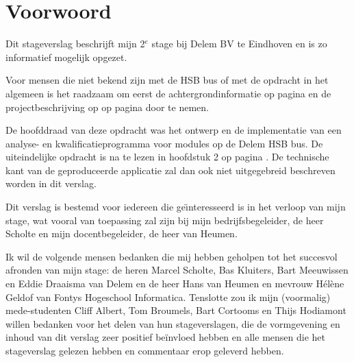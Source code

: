 \chapter{Voorwoord}

Dit stageverslag beschrijft mijn 2$^e$ stage bij Delem BV te Eindhoven en is zo informatief mogelijk opgezet.

Voor mensen die niet bekend zijn met de HSB bus of met de opdracht in het algemeen is het raadzaam om eerst de achtergrondinformatie op pagina \pageref{achtergrondinfo} en de projectbeschrijving op op pagina \pageref{project} door te nemen.

De hoofddraad van deze opdracht was het ontwerp en de implementatie van een analyse- en kwalificatieprogramma voor modules op de Delem HSB bus. De uiteindelijke opdracht is na te lezen in hoofdstuk 2 op pagina \pageref{opdracht}. De technische kant van de geproduceerde applicatie zal dan ook niet uitgegebreid beschreven worden in dit verslag.

Dit verslag is bestemd voor iedereen die ge\"\i nteresseerd is in het verloop van mijn stage, wat vooral van toepassing zal zijn bij mijn bedrijfsbegeleider, de heer Scholte en mijn docentbegeleider, de heer van Heumen.

Ik wil de volgende mensen bedanken die mij hebben geholpen tot het succesvol afronden van mijn stage: de heren Marcel Scholte, Bas Kluiters, Bart Meeuwissen en Eddie Draaisma van Delem en de heer Hans van Heumen en mevrouw H\'el\`ene Geldof van Fontys Hogeschool Informatica. Tenslotte zou ik mijn (voormalig) mede-studenten Cliff Albert, Tom Broumels, Bart Cortooms en Thijs Hodiamont willen bedanken voor het delen van hun stageverslagen, die de vormgevening en inhoud van dit verslag zeer positief be\"invloed hebben en alle mensen die het stageverslag gelezen hebben en commentaar erop geleverd hebben.
